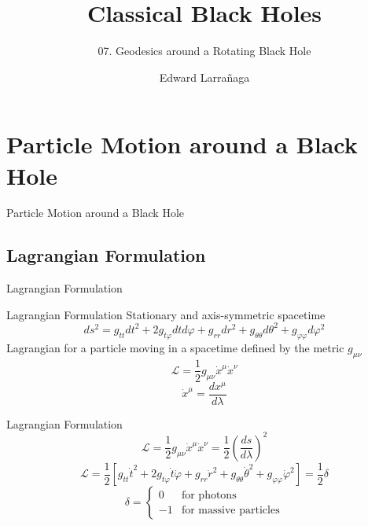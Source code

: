 \documentclass{beamer}
\title{Classical Black Holes} %
\subtitle{07. Geodesics around a Rotating Black Hole} %
\author{Edward Larra\~{n}aga}
\begin{document}
\frame{\maketitle}


\section{Particle Motion around a Black Hole}
\begin{frame}
\Huge
Particle Motion around a Black Hole
\end{frame}

\subsection{Lagrangian Formulation}
\begin{frame}
	\huge
    Lagrangian Formulation
\end{frame}

\begin{frame}{Lagrangian Formulation}
	Stationary and axis-symmetric spacetime
	$$ ds^2 = g_{tt} dt^2 + 2g_{t \varphi} dt d\varphi + g_{rr} dr^2 + g_{\theta \theta} d\theta^2 + g_{\varphi \varphi} d\varphi^2 $$
	\pause
	Lagrangian for a particle moving in a spacetime defined by the metric $g_{\mu\nu}$
	$$ \mathcal{L} = \frac{1}{2} g_{\mu\nu} \dot{x}^\mu \dot{x}^\nu $$
	\pause
	$$ \dot{x}^\mu = \frac{dx^\mu}{d\lambda} $$
\end{frame}

\begin{frame}{Lagrangian Formulation}
	$$ \mathcal{L} = \frac{1}{2} g_{\mu\nu} \dot{x}^\mu \dot{x}^\nu = \frac{1}{2}  \left( \frac{ds}{d\lambda} \right)^2 $$
	\pause	
	$$ \mathcal{L} =\frac{1}{2} \left[ g_{tt} \dot{t}^2 + 2g_{t \varphi} \dot{t} \dot{\varphi} + g_{rr} \dot{r}^2 + g_{\theta \theta} \dot{\theta}^2 + g_{\varphi \varphi} \dot{\varphi}^2 \right] = \frac{1}{2} \delta$$
	\pause
	\[	\delta = 
	\begin{cases}
	0   &\textrm{for photons} \\
	-1  &\textrm{for massive particles}
	\end{cases}	
	\]
\end{frame}
\end{document}
